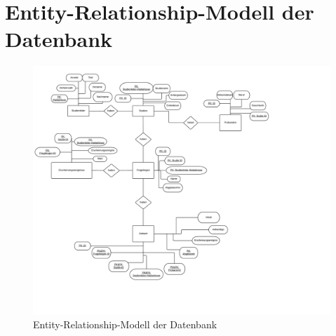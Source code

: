 \documentclass[a4paper]{scrreprt}
\begin{document}
        \newpage
        \section{Entity-Relationship-Modell der Datenbank}
            \begin{figure}[ht]
                \centering
                \includegraphics[scale = 0.13]{PSE_Datenbank_ERM.jpeg}
                \caption{Entity-Relationship-Modell der Datenbank}
            \end{figure}
\end{document}
